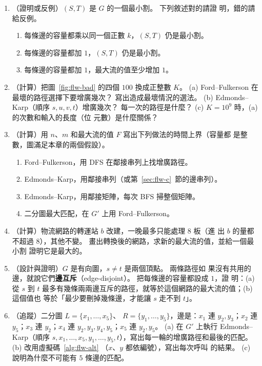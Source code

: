 \begin{enumerate}
\item \label{q:flw-plus1}（證明或反例）$(S, T)$ 是 $G$ 的一個最小割。 下列敘述對的請證
明，錯的請給反例。
\begin{enumerate}
\item 每條邊的容量都乘以同一個正數 $k$，$(S, T)$ 仍是最小割。
\item 每條邊的容量都加 $1$，$(S, T)$ 仍是最小割。
\item 每條邊的容量都加 $1$，最大流的值至少增加 $1$。
\end{enumerate}

\item \label{q:flw-bad}（計算）把圖~\ref{fig:flw-bad} 的四個 $100$ 換成正整數 $K$。 (a) Ford--Fulkerson
在最壞的路徑選擇下要增廣幾次？ 寫出造成最壞情況的選法。 (b) Edmonds--Karp（順序
$s, u, v, t$）增廣幾次？ 每一次的路徑是什麼？ (c) $K = 10^9$ 時，(a) 的次數和輸入的長度（位
元數）是什麼關係？

\item \label{q:flw-time}（計算）用 $n$、$m$ 和最大流的值 $F$ 寫出下列做法的時間上界（容量都
是整數，圖滿足本章的兩個假設）。
\begin{enumerate}
\item Ford--Fulkerson，用 DFS 在鄰接串列上找增廣路徑。
\item Edmonds--Karp，用鄰接串列（或第~\ref{sec:flw-c}~節的邊串列）。
\item Edmonds--Karp，用鄰接矩陣，每次 BFS 掃整個矩陣。
\item 二分圖最大匹配，在 $G'$ 上用 Ford--Fulkerson。
\end{enumerate}

\item \label{q:flw-vertex}（計算）物流網路的轉運站 $b$ 改建，一晚最多只能處理 $8$ 板（進
出 $b$ 的量都不超過 $8$），其他不變。 畫出轉換後的網路，求新的最大流的值，並給一個最小割
證明它是最大的。

\item \label{q:flw-disjoint}（設計與證明）$G$ 是有向圖，$s \ne t$ 是兩個頂點。 兩條路徑如
果沒有共用的邊，就說它們\textbf{邊互斥}（edge-disjoint）。 把每條邊的容量都設成 $1$，證
明：(a) 從 $s$ 到 $t$ 最多有幾條兩兩邊互斥的路徑，就等於這個網路的最大流的值；(b) 這個值也
等於「最少要刪掉幾條邊，才能讓 $s$ 走不到 $t$」。

\item \label{q:flw-mtrace}（追蹤）二分圖 $L = \{x_1, \ldots, x_5\}$、
$R = \{y_1, \ldots, y_5\}$，邊是：$x_1$ 連 $y_2, y_3$；$x_2$ 連 $y_5$；$x_3$ 連 $y_2$；$x_4$
連 $y_2, y_3, y_4, y_5$；$x_5$ 連 $y_2, y_5$。 (a) 在 $G'$ 上執行 Edmonds--Karp（順序
$s, x_1, \ldots, x_5, y_1, \ldots, y_5, t$），寫出每一輪的增廣路徑和最後的匹配。 (b) 改用虛擬碼~\ref{alg:flw-alt}
（$x$、$y$ 都依編號），寫出每次呼叫  的結果。 (c) 說明為什麼不可能有 $5$
條邊的匹配。


\end{enumerate}
